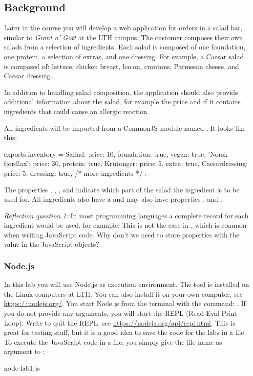 \documentclass[fleqn, article, a4paper]{memoir}
\begin{document}
\subsection*{Background}

Later in the course you will develop a web application for orders in a salad bar, similar to \emph{Grönt o' Gott} at the LTH campus. The customer composes their own salads from a selection of ingredients. Each salad is composed of one foundation, one protein, a selection of extras, and one dressing. For example, a Caesar salad is composed of: lettuce, chicken breast, bacon, croutons, Parmesan cheese, and Caesar dressing.

In addition to handling salad composition, the application should also provide additional information about the salad, for example the price and if it contains ingredients that could cause an allergic reaction.

\noindent All ingredients will be imported from a CommonJS module named . It looks like this:
\begin{Code}
exports.inventory = {
  Sallad: {price: 10, foundation: true, vegan: true}, 
  'Norsk fjordlax': {price: 30, protein: true},
  Krutonger: {price: 5, extra: true},
  Caesardressing: {price: 5, dressing: true},
  /* more ingredients */
};
\end{Code}
\noindent The properties , , , and  indicate which part of the salad the ingredient is to be used for. All ingredients also have a  and may also have properties ,  and .

\noindent \emph{Reflection question 1:} In most programming languages a complete record for each ingredient would be used, for example: 
This is not the case in , which is common when writing JavaScript code. Why don't we need to store properties with the value  in the JavaScript objects?


\subsubsection*{Node.js}

In this lab you will use Node.js as execution environment. The tool is installed on the Linux computers at LTH. You can also install it on your own computer, see \url{https://nodejs.org/}. You start Node.js from the terminal with the command: . If you do not provide any arguments, you will start the REPL (Read-Eval-Print-Loop). Write  to quit the REPL, see \url{https://nodejs.org/api/repl.html}. This is great for testing stuff, but it is a good idea to save the code for the labs in a file. To execute the JavaScript code in a file, you simply give the file name as argument to :
\begin{Code}
  node lab1.js
\end{Code}
 
\end{document}
